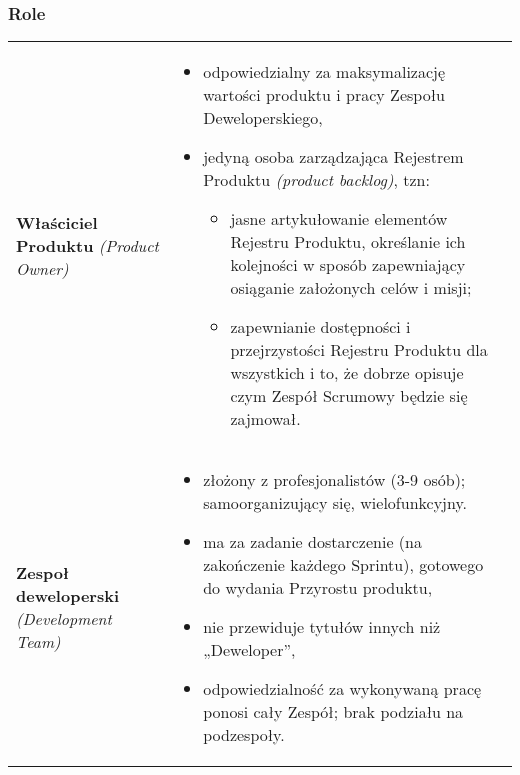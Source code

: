 \documentclass[../main.tex]{subfiles}
\begin{document}
    \subsubsection{Role}
    \begin{table}[H]
        \begin{center}
            \begin{tabular}{ p{} p{} }
                \textbf{Właściciel Produktu} \textit{(Product Owner)}
                &
                \begin{itemize}
                    \item odpowiedzialny za maksymalizację wartości produktu i pracy Zespołu
                    Deweloperskiego,
                    \item jedyną osoba zarządzająca Rejestrem Produktu \textit{(product backlog)}, tzn:
                    \begin{itemize}
                        \item jasne artykułowanie elementów Rejestru Produktu, określanie
                        ich kolejności w sposób zapewniający osiąganie założonych celów i misji;
                        \item zapewnianie dostępności i przejrzystości Rejestru Produktu dla wszystkich i to, że dobrze opisuje czym
                        Zespół Scrumowy będzie się zajmował.
                    \end{itemize}
                \end{itemize}
                \\

                \cmidrule(r){1-1}\cmidrule(l){2-2}
                \textbf{Zespoł deweloperski} \textit{(Development Team)}
                &
                \begin{itemize}
                    \item złożony z profesjonalistów (3-9 osób); samoorganizujący się, wielofunkcyjny.
                    \item ma za zadanie dostarczenie (na zakończenie
                    każdego Sprintu), gotowego do wydania Przyrostu produktu,
                    \item nie przewiduje tytułów innych niż „Deweloper”,
                    \item odpowiedzialność za wykonywaną pracę ponosi cały Zespół; brak podziału na podzespoły.
                \end{itemize}
                \\


\end{tabular}
\end{center}
\end{table}
\end{document}
